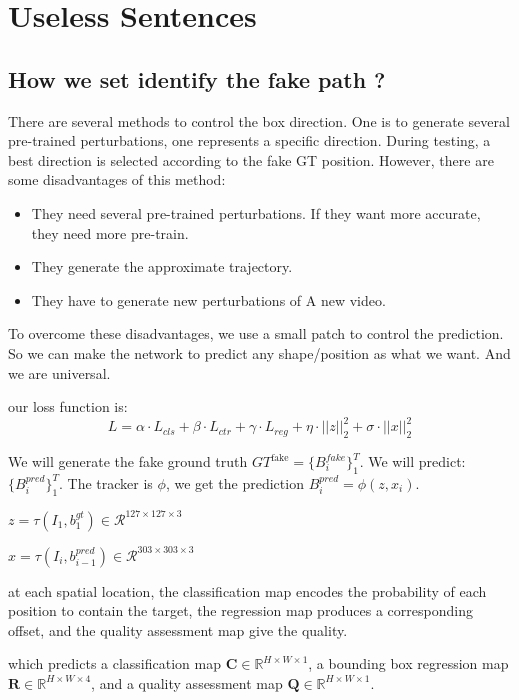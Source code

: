 \documentclass{article}
\begin{document}
\clearpage



\iffalse
\section{Useless Sentences}

\subsection{How we set identify the fake path ?}

There are several methods to control the box direction. One is to generate several pre-trained perturbations, one represents a specific direction. During testing, a best direction is selected according to the fake GT position. However, there are some disadvantages of this method:
\begin{itemize}
\item They need several pre-trained perturbations. If they want more accurate, they need more pre-train.
\item They generate the approximate trajectory.
\item They have to generate  new perturbations of A new video.
\end{itemize}
To overcome these disadvantages, we use a small patch to control the prediction. So we can make the network to predict any shape/position as what we want. And we are universal.

our loss function is:
\begin{equation}
L = \alpha \cdot L_{cls} + \beta \cdot L_{ctr} +  \gamma \cdot L_{reg} + \eta \cdot ||z||_2^2 +  \sigma \cdot ||x||^2_2
\end{equation}

We will generate the fake ground truth $GT^{\text{fake}}=\{B^{fake}_i\}_1^T$.
We will predict: $\{B^{pred}_i\}_1^T$.
The tracker is $\phi$, we get the prediction $B_i^{pred}=\phi(z, x_i)$.

$z = \tau (I_1, b^{gt}_1)\in \mathcal{R}^{127\times 127\times 3}$

$x = \tau(I_i, b_{i-1}^{pred})\in \mathcal{R}^{303\times 303 \times 3}$

at each spatial location, the classification map encodes the probability of each position to contain the target, the regression map produces a corresponding offset, and the quality assessment map give the quality. 

which predicts a classification map $\textbf{C}\in \mathbb{R}^{H\times W\times 1}$, a bounding box regression map $\textbf{R}\in \mathbb{R}^{H\times W\times 4}$, and a quality assessment map $\textbf{Q}\in \mathbb{R}^{H\times W\times 1}$.
\end{document}
